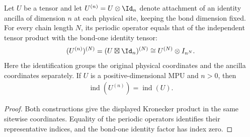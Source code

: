 \begin{lemma}
    \label{thm:mpu_physical_ancilla_index}
    \leanok
    Let $U$ be a tensor and let $U^{(n)}=U\otimes\Id_n$ denote attachment
    of an identity ancilla of dimension $n$ at each physical site, keeping
    the bond dimension fixed. For every chain length $N$, its periodic
    operator equals that of the independent tensor product with the
    bond-one identity tensor:
    \begin{align}
        (U^{(n)})^{(N)}=(U\boxtimes\Id_n)^{(N)}
        \cong U^{(N)}\otimes I_{n^N}.
    \end{align}
    Here the identification groups the original physical coordinates and
    the ancilla coordinates separately. If $U$ is a positive-dimensional
    MPU and $n>0$, then
    \begin{align}
        \operatorname{ind}(U^{(n)})=\operatorname{ind}(U).
    \end{align}
\end{lemma}

\begin{proof}\leanok
    Both constructions give the displayed Kronecker product in the same
    sitewise coordinates. Equality of the periodic operators identifies
    their representative indices, and the bond-one identity factor has
    index zero.
\end{proof}

